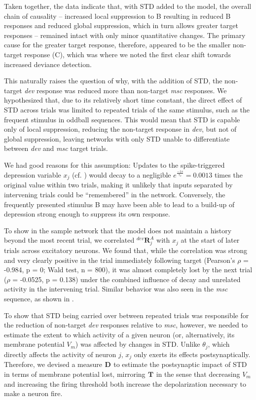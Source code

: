 \documentclass[9pt,lineno,onehalfspacing]{elife}
\newcommand{\dev}{\textit{dev}}
\newcommand{\msc}{\textit{msc}}
\newcommand{\R}[3][]{{}^{#1}_{}\boldsymbol R^{#2}_{#3}}
\newcommand{\T}[3][]{{}^{#1}_{}\boldsymbol T^{#2}_{#3}}
\newcommand{\D}[3][]{{}^{#1}_{}\boldsymbol D^{#2}_{#3}}
\begin{document}
Taken together, the data indicate that, with STD added to the model, the overall chain of causality -- increased local suppression to B resulting in reduced B responses and reduced global suppression, which in turn allows greater target responses -- remained intact with only minor quantitative changes. The primary cause for the greater target response, therefore, appeared to be the smaller non-target response (C), which was where we noted the first clear shift towards increased deviance detection.

This naturally raises the question of why, with the addition of STD, the non-target \dev{} response was reduced more than non-target \msc{} responses. We hypothesized that, due to its relatively short time constant, the direct effect of STD across trials was limited to repeated trials of the same stimulus, such as the frequent stimulus in oddball sequences. This would mean that STD is capable only of local suppression, reducing the non-target response in \dev{}, but not of global suppression, leaving networks with only STD unable to differentiate between \dev{} and \msc{} target trials.

We had good reasons for this assumption: Updates to the spike-triggered depression variable $x_j$ (cf. ) would decay to a negligible $e^\frac{-1 s}{\tau_x} = 0.0013$ times the original value within two trials, making it unlikely that inputs separated by intervening trials could be ``remembered'' in the network. Conversely, the frequently presented stimulus B may have been able to lead to a build-up of depression strong enough to suppress its own response.

To show in the sample network that the model does not maintain a history beyond the most recent trial, we correlated $\R[dev]{A}{j}$ with $x_j$ at the start of later trials across excitatory neurons. We found that, while the correlation was strong and very clearly positive in the trial immediately following target (Pearson's $\rho$ = -0.984, p = 0; Wald test, n = 800), it was almost completely lost by the next trial ($\rho$ = -0.0525, p = 0.138) under the combined influence of decay and unrelated activity in the intervening trial. Similar behavior was also seen in the \msc{} sequence, as shown in .

To show that STD being carried over between repeated trials was responsible for the reduction of non-target \dev{} responses relative to \msc{}, however, we needed to estimate the extent to which activity of a given neuron (or, alternatively, its membrane potential $V_m$) was affected by changes in STD. Unlike $\theta_j$, which directly affects the activity of neuron $j$, $x_j$ only exerts its effects postsynaptically. Therefore, we devised a measure $\D{}{}$ to estimate the postsynaptic impact of STD in terms of membrane potential lost, mirroring $\T{}{}$ in the sense that decreasing $V_m$ and increasing the firing threshold both increase the depolarization necessary to make a neuron fire.
\end{document}
